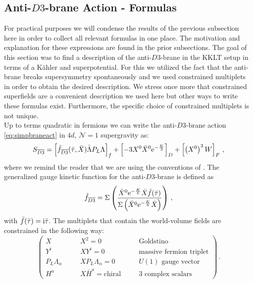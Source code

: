\documentclass[12pt]{report}
\newcommand{\be}{\begin{equation}}
\newcommand{\ee}{\end{equation}}
\def\rmi{{\rm i}}
\def\rme{{\rm e}}
\begin{document}
\subsection{Anti-$D3$-brane Action - Formulas}
For practical purposes we will condense the results of the previous subsection here in order to collect all relevant formulas in one place. The motivation and explanation for these expressions are found in the prior subsections. The goal of this section was to find a description of the anti-$D3$-brane in the KKLT setup in terms of a Kähler and superpotential. For this we utilized the fact that the anti-brane breaks supersymmetry spontaneously and we used constrained multiplets in order to obtain the desired description. We stress once more that constrained superfields are a convenient description we used here but other ways to write these formulas exist. Furthermore, the specific choice of constrained multiplets is not unique.\\
Up to terms quadratic in fermions we can write the anti-$D3$-brane action \eqref{eq:simpbraneact} in $4d$, $\mathcal{N}=1$ supergravity as:
\be 
S_{\overline{D3}}=\left[\hat{f}_{\overline{D3}}(\bar{\tau},\bar{X}) \bar{\Lambda}P_L\Lambda\right]_f + \left[-3X^0 \bar{X}^0\rme^{-\frac{K}{3}}\right]_D + \left[\left(X^0\right)^3 W\right]_F\,,
\label{eq:D3barfinalact}
\ee
where we remind the reader that we are using the conventions of \cite{Freedman:2012zz}. The generalized gauge kinetic function for the anti-$D3$-brane is defined as
\be 
\hat{f}_{\overline{D3}} = \Sigma\left( \frac{\bar{X}^0 \rme^{-\frac{K}{6}}\bar{X}\bar{f}(\bar{\tau})}{\Sigma \left( \bar{X}^0 \rme^{-\frac{K}{6}}\bar{X}\right)}\right)\,,
\ee
with $\bar{f}(\bar{\tau}) = \rmi \bar{\tau}$. The multiplets that contain the world-volume fields are constrained in the following way:
\be
\begin{pmatrix}
X & \quad & X^2=0 & \quad & \text{Goldstino}\\
Y^i & & X Y^i = 0& & \text{massive fermion triplet}\\
P_L \Lambda_\alpha & & X P_L \Lambda_\alpha = 0 & & U(1) \text{ gauge vector}\\
H^a & & X\bar{H}^a = \text{chiral} & & \text{3 complex scalars}
\end{pmatrix}\,.
\label{eq:D3barmultfinal}
\ee
\end{document}
